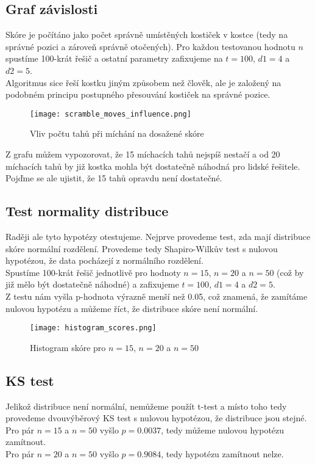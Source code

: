\documentclass{article}
\begin{document}
\subsection*{Graf závislosti}
Skóre je počítáno jako počet správně umístěných kostiček v kostce (tedy na správné pozici a zároveň správně otočených).
Pro každou testovanou hodnotu $n$ spustíme 100-krát řešič a ostatní parametry zafixujeme na
$t = 100$, $d1 = 4$ a $d2 = 5$.\\
Algoritmus sice řeší kostku jiným způsobem než člověk, ale je založený na podobném principu 
postupného přesouvání kostiček na správné pozice.

\begin{figure}[h]
    \centering
    \texttt{[image: scramble\_moves\_influence.png]}
    \caption{Vliv počtu tahů při míchání na dosažené skóre}
    \label{fig:scramble_moves_influence}
\end{figure}

Z grafu můžem vypozorovat, že 15 míchacích tahů nejspíš nestačí a od 20 míchacích
tahů by již kostka mohla být dostatečně náhodná pro lidské řešitele.\\
Pojďme se ale ujistit, že 15 tahů opravdu není dostatečné.

\subsection*{Test normality distribuce}
Raději ale tyto hypotézy otestujeme. Nejprve provedeme test, zda mají distribuce skóre normální rozdělení.
Provedeme tedy Shapiro-Wilkův test s nulovou hypotézou, že data pocházejí z normálního rozdělení.\\
Spustíme 100-krát řešič jednotlivě pro hodnoty $n = 15$, $n = 20$ a $n = 50$ (což by již mělo být dostatečně náhodné)
a zafixujeme $t = 100$, $d1 = 4$ a $d2 = 5$.\\
Z testu nám vyšla p-hodnota výrazně menší než 0.05, což znamená, že zamítáme nulovou hypotézu a 
můžeme říct, že distribuce skóre není normální.\\

\begin{figure}[h]
    \centering
    \texttt{[image: histogram\_scores.png]}
    \caption{Histogram skóre pro $n = 15$, $n = 20$ a $n = 50$}
    \label{fig:histogram_scores}
\end{figure}

\subsection*{KS test}
Jelikož distribuce není normální, nemůžeme použít t-test a místo toho tedy provedeme
dvouvýběrový KS test s nulovou hypotézou, že distribuce jsou stejné.\\
Pro pár $n = 15$ a $n = 50$ vyšlo $p=0.0037$, tedy můžeme nulovou hypotézu zamítnout.\\
Pro pár $n = 20$ a $n = 50$ vyšlo $p=0.9084$, tedy hypotézu zamítnout nelze.
\end{document}
